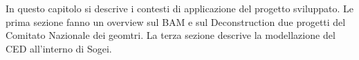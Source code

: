 In questo capitolo si descrive i contesti di applicazione del progetto sviluppato.
Le prima sezione fanno un overview sul BAM e sul Deconstruction due progetti
del Comitato Nazionale dei geomtri. La terza sezione descrive la modellazione
del CED all'interno di Sogei.
